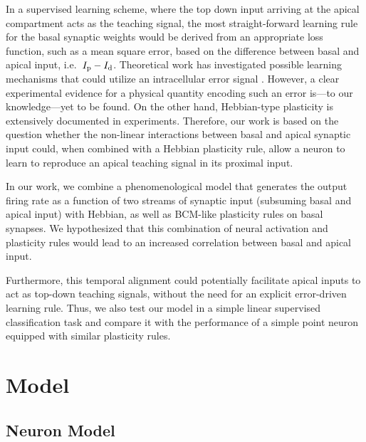 \documentclass[10pt,a4paper,twocolumn]{article}
\begin{document}
		In a supervised learning scheme, where the top down input
		arriving at the apical compartment acts as the teaching signal,
		the most straight-forward learning rule for the basal synaptic
		weights would be derived from an appropriate loss function,
		such as a mean square error, based on the difference between 
		basal and apical input, i.e.\ $I_{\rm p} - I_{\rm d}$. Theoretical work has 
		investigated possible learning mechanisms
		that could utilize an intracellular error signal
		\citep{Urbanczik_2014,Schiess_2016,Guerguiev_2017}.
		However, a clear experimental
		evidence for a physical quantity encoding such an error 
		is---to our knowledge---yet to be found. 
		On the other hand, Hebbian-type plasticity is extensively
		documented in experiments. Therefore, our work is
		based on the question whether the non-linear interactions
		between basal and apical synaptic input could, when
		combined with a Hebbian plasticity rule, allow a neuron
		to learn to reproduce an apical teaching signal in its
		proximal input.
		
		In our work, we combine a phenomenological model that generates the output
		firing rate as a function of two streams of synaptic input (subsuming basal and apical input)
		with Hebbian, as well as BCM-like plasticity rules on basal synapses. We hypothesized that 
		this combination of neural activation and plasticity rules would lead to an
		increased correlation between basal and apical input.
		
		Furthermore, this temporal alignment could potentially facilitate apical inputs to act
		as top-down teaching signals, without the need for an explicit error-driven
		learning rule. Thus, we also test our model in a simple linear 
		supervised classification task and compare it with the performance of a simple
		point neuron equipped with similar plasticity rules.
		
		\section{Model}
		
		\subsection{Neuron Model}
		
\end{document}
